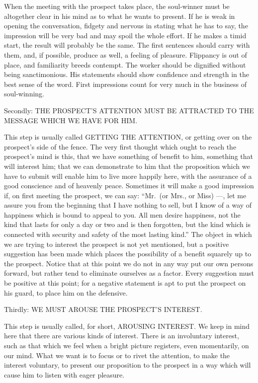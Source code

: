 \documentclass[
]{book}
\begin{document}
When the meeting with the prospect takes place, the soul-winner must be altogether clear in his mind as to what he wants to present. If he is weak in opening the conversation, fidgety and nervous in stating what he has to say, the impression will be very bad and may spoil the whole effort. If he makes a timid start, the result will probably be the same. The first sentences should carry with them, and, if possible, produce as well, a feeling of pleasure. Flippancy is out of place, and familiarity breeds contempt. The worker should be dignified without being sanctimonious. His statements should show confidence and strength in the best sense of the word. First impressions count for very much in the business of soul-winning.

Secondly: THE PROSPECT'S ATTENTION MUST BE ATTRACTED TO THE MESSAGE WHICH WE HAVE FOR HIM.

This step is usually called GETTING THE ATTENTION, or getting over on the prospect's side of the fence. The very first thought which ought to reach the prospect's mind is this, that we have something of benefit to him, something that will interest him; that we can demonstrate to him that the proposition which we have to submit will enable him to live more happily here, with the assurance of a good conscience and of heavenly peace. Sometimes it will make a good impression if, on first meeting the prospect, we can say: ``Mr.~(or Mrs., or Miss) ---, let me assure you from the beginning that I have nothing to sell, but I know of a way of happiness which is bound to appeal to you. All men desire happiness, not the kind that lasts for only a day or two and is then forgotten, but the kind which is connected with security and safety of the most lasting kind.'' The object in which we are trying to interest the prospect is not yet mentioned, but a positive suggestion has been made which places the possibility of a benefit squarely up to the prospect. Notice that at this point we do not in any way put our own persons forward, but rather tend to eliminate ourselves as a factor. Every suggestion must be positive at this point; for a negative statement is apt to put the prospect on his guard, to place him on the defensive.

Thirdly: WE MUST AROUSE THE PROSPECT'S INTEREST.

This step is usually called, for short, AROUSING INTEREST. We keep in mind here that there are various kinds of interest. There is an involuntary interest, such as that which we feel when a bright picture registers, even momentarily, on our mind. What we want is to focus or to rivet the attention, to make the interest voluntary, to present our proposition to the prospect in a way which will cause him to listen with eager pleasure.
\end{document}
